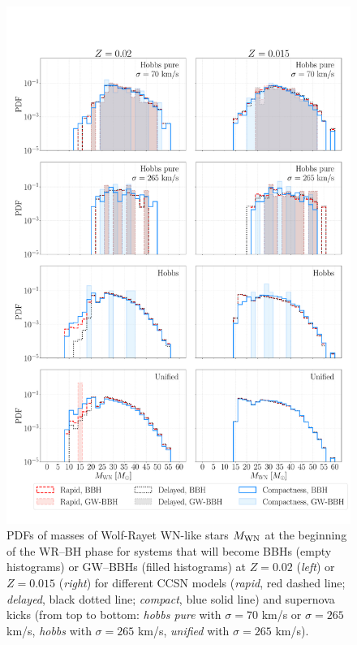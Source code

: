 \documentclass[a4paper,titlepage]{book}     	%
\begin{document}
\begin{appendices}
\begin{figure}
	\centering
	\includegraphics[width=\textwidth]{./images/WRBH-MWRnonpureHe.pdf}	
	\caption{PDFs of masses of Wolf-Rayet WN-like stars $M_{\rm WN}$ at the beginning of the WR--BH phase for systems that will become BBHs (empty histograms) or GW--BBHs (filled histograms) at $Z=0.02$ (\emph{left}) or $Z=0.015$ (\emph{right}) for different CCSN models (\emph{rapid}, red dashed line; \emph{delayed}, black dotted line; \emph{compact}, blue solid line) and supernova kicks (from top to bottom: \emph{hobbs pure} with $\sigma = 70$ km/s or $\sigma = 265$ km/s, \emph{hobbs} with $\sigma = 265$ km/s, \emph{unified} with $\sigma = 265$ km/s).}\label{fig:resultsWRBH-MWRnonpureHe}
\end{figure}


\end{appendices}
\end{document}
